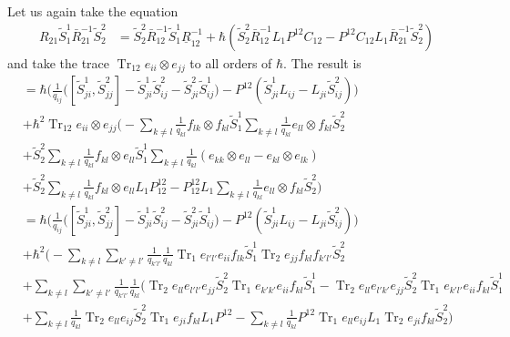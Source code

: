 \documentclass[11pt]{report}
\theoremstyle{definition}
\theoremstyle{remark}
\theoremstyle{remark}
\begin{document}
Let us again take the equation
\begin{align*}
R_{21} \tilde S_1^1 \bar R_{21}^{-1} \tilde S_2^2
&= \tilde S_2^2 \bar R_{12}^{-1} \tilde S_1^1 \underline{R}_{12}^{-1} + \hbar (\tilde S_2^2 \bar R_{12}^{-1} L_1 P^{12} C_{12} - P^{12} C_{12} L_1 \bar R_{21}^{-1} \tilde S_2^2)
\end{align*}
and take the trace $\operatorname{Tr}_{12} e_{ii} \otimes e_{jj}$ to all orders of $\hbar$. The result is
\begin{align*}
[S_{ii}^1,S_{jj}^2]
&= \hbar \bigg( \frac{1}{q_{ij}} \bigg( [\tilde S_{ji}^1,\tilde S_{jj}^2] - \tilde S_{ji}^1 \tilde S_{ij}^2 - \tilde S_{ji}^2 \tilde S_{ij}^1 \bigg) - P^{12}(\tilde S_{ji}^1 L_{ij} -L_{ji} \tilde S_{ij}^2) \bigg) \\
&+ \hbar^2 \operatorname{Tr}_{12} e_{ii} \otimes e_{jj} \bigg( -\sum_{k \neq l} \frac{1}{q_{kl}} f_{lk} \otimes f_{kl} \tilde S_1^1 \sum_{k \neq l} \frac{1}{q_{kl}} e_{ll} \otimes f_{kl} \tilde S_2^2 \\
&+ \tilde S_2^2 \sum_{k \neq l} \frac{1}{q_{kl}} f_{kl} \otimes e_{ll} \tilde S_1^1 \sum_{k \neq l} \frac{1}{q_{kl}} (e_{kk} \otimes e_{ll}-e_{kl} \otimes e_{lk}) \\
&+ \tilde S_2^2 \sum_{k \neq l} \frac{1}{q_{kl}}f_{kl} \otimes e_{ll} L_1 P_{12}^{12}
- P_{12}^{12} L_1 \sum_{k \neq l} \frac{1}{q_{kl}} e_{ll} \otimes f_{kl} \tilde S_2^2 \bigg) \\
&= \hbar \bigg( \frac{1}{q_{ij}} \bigg( [\tilde S_{ji}^1,\tilde S_{jj}^2] - \tilde S_{ji}^1 \tilde S_{ij}^2 - \tilde S_{ji}^2 \tilde S_{ij}^1 \bigg) - P^{12}(\tilde S_{ji}^1 L_{ij} -L_{ji} \tilde S_{ij}^2) \bigg) \\
&+ \hbar^2 \bigg( -\sum_{k \neq l} \sum_{k' \neq l'} \frac{1}{q_{k'l'}} \frac{1}{q_{kl}} 
\operatorname{Tr}_1 e_{l'l'} e_{ii} f_{lk} \tilde S_1^1 \operatorname{Tr}_2 e_{jj} f_{kl} f_{k'l'} \tilde S_2^2 \\
&+ \sum_{k \neq l} \sum_{k' \neq l'} \frac{1}{q_{k'l'}} \frac{1}{q_{kl}}
(\operatorname{Tr}_2 e_{ll} e_{l'l'} e_{jj} \tilde S_2^2 \operatorname{Tr}_1 e_{k'k'} e_{ii} f_{kl} \tilde S_1^1 - \operatorname{Tr}_2 e_{ll} e_{l'k'} e_{jj} \tilde S_2^2 \operatorname{Tr}_1 e_{k'l'} e_{ii} f_{kl} \tilde S_1^1 \\
&+ \sum_{k \neq l} \frac{1}{q_{kl}}
\operatorname{Tr}_2 e_{ll} e_{ij} \tilde S_2^2 \operatorname{Tr}_1 e_{ji} f_{kl} L_1 P^{12}
- \sum_{k \neq l} \frac{1}{q_{kl}}
P^{12} \operatorname{Tr}_1 e_{ll} e_{ij} L_1 \operatorname{Tr}_2 e_{ji} f_{kl} \tilde S_2^2 \bigg) \\

\end{align*}
\end{document}
